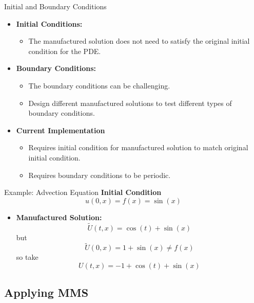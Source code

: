 \documentclass{beamer}
\begin{document}
\begin{frame}{Initial and Boundary Conditions}
    \begin{itemize}
        \item \textbf{Initial Conditions:}
            \begin{itemize}
                \item The manufactured solution does not need to satisfy the original initial condition for the PDE.
            \end{itemize}
        \item \textbf{Boundary Conditions:}
            \begin{itemize}
                \item The boundary conditions can be challenging.
                \item Design different manufactured solutions to test different types of boundary conditions.
            \end{itemize}
        \item \textbf{Current Implementation}
            \begin{itemize}
                \item Requires initial condition for manufactured solution to match original initial condition. 
                \item Requires boundary conditions to be periodic.  
            \end{itemize}
    \end{itemize}
\end{frame}

\begin{frame}{Example: Advection Equation}
    \textbf{Initial Condition}
    \[
        u(0,x) = f(x) = \sin(x)
    \]
    \begin{itemize}
        \item \textbf{Manufactured Solution:}
        \[ 
            \tilde{U}(t,x) = \cos(t) + \sin(x)
        \]
        but
        \[ 
            \tilde{U}(0,x) = 1 + \sin(x) \neq f(x)
        \]
        so take
        \[ 
            U(t,x) = - 1 + \cos(t) + \sin(x)
        \]
    \end{itemize}
\end{frame}

\subsection{Applying MMS}
\end{document}
